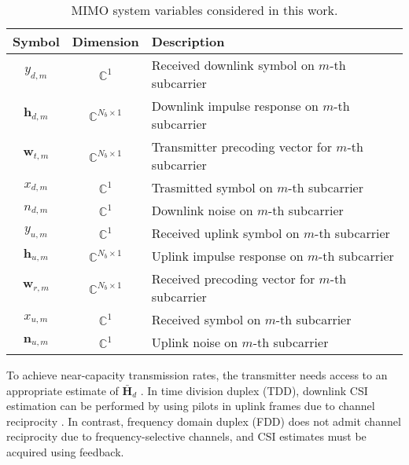 \begin{table}[]
\centering
\caption{MIMO system variables considered in this work.}
\label{tab:cost-params}
\begin{tabular}{c|c|l}
\toprule
\textbf{Symbol}   & \textbf{Dimension}          & \textbf{Description} \\ \midrule
$y_{d,m}$ 		  & $\mathbb{C}^{1}$ 			& Received downlink symbol on $m$-th subcarrier  \\ \hline
$\mathbf h_{d,m}$ & $\mathbb{C}^{N_b \times 1}$ & Downlink impulse response on $m$-th subcarrier  \\ \hline
$\mathbf w_{t,m}$ & $\mathbb{C}^{N_b \times 1}$ & Transmitter precoding vector for $m$-th subcarrier  \\ \hline
$x_{d,m}$ 		  & $\mathbb{C}^{1}$ 			& Trasmitted symbol on $m$-th subcarrier  \\ \hline
$n_{d,m}$ 		  & $\mathbb{C}^{1}$ 			& Downlink noise on $m$-th subcarrier  \\ \hline
$y_{u,m}$ 		  & $\mathbb{C}^{1}$ 			& Received uplink symbol on $m$-th subcarrier  \\ \hline
$\mathbf h_{u,m}$ & $\mathbb{C}^{N_b \times 1}$ & Uplink impulse response on $m$-th subcarrier  \\ \hline
$\mathbf w_{r,m}$ & $\mathbb{C}^{N_b \times 1}$ & Received precoding vector for $m$-th subcarrier  \\ \hline
$x_{u,m}$ 		  & $\mathbb{C}^{1}$ 			& Received symbol on $m$-th subcarrier  \\ \hline
$\mathbf n_{u,m}$ & $\mathbb{C}^{1}$ 			& Uplink noise on $m$-th subcarrier  \\ \hline
\end{tabular}
\end{table}
To achieve near-capacity transmission rates, the transmitter needs access to an appropriate estimate of $\bar{\mathbf H}_d$ \cite{ref:goldsmith2003capacity}. In time division duplex (TDD), downlink CSI estimation can be performed by using pilots in uplink frames due to channel reciprocity \cite{ref:Kaltenberger2010relative,ref:mi2017massive,ref:Gao2010utilization}. In contrast, frequency domain duplex (FDD) does not admit channel reciprocity due to frequency-selective channels, and CSI estimates must be acquired using feedback.


